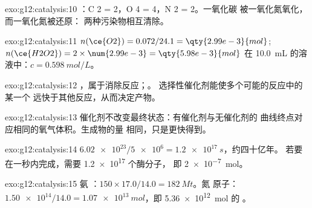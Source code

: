 \begin{solution}{exo:g12:catalysis:10}
：C 2 = 2，O 4 = 4，N 2 = 2。一氧化碳
被一氧化氮氧化，而一氧化氮被还原：
两种污染物相互清除。
\end{solution}

\begin{solution}{exo:g12:catalysis:11}
$n(\ce{O2}) = 0.072 / 24.1 = \qty{2.99e-3}{mol}$;
$n(\ce{H2O2}) = 2 \times \num{2.99e-3} = \qty{5.98e-3}{mol}$ 在
\qty{10.0}{mL} 的溶液中：$c = \qty{0.598}{mol/L}$。
\end{solution}

\begin{solution}{exo:g12:catalysis:12}
，属于消除反应；。
选择性催化剂能使多个可能的反应中的某一个
远快于其他反应，从而决定产物。
\end{solution}

\begin{solution}{exo:g12:catalysis:13}
催化剂不改变最终状态：有催化剂与无催化剂的
曲线终点对应相同的氧气体积。生成物的量
相同，只是更快得到。
\end{solution}

\begin{solution}{exo:g12:catalysis:14}
$\num{6.02e23} / \num{5e6} = \qty{1.2e17}{s}$，约四十亿年。
若要在一秒内完成，需要 \num{1.2e17} 个酶分子，
即 \qty{2e-7}{mol}。
\end{solution}

\begin{solution}{exo:g12:catalysis:15}
氨 ：$150 \times 17.0 / 14.0 = \qty{182}{Mt}$。氮
原子：$\num{1.50e14} / 14.0 = \qty{1.07e13}{mol}$，即
\qty{5.36e12}{mol} 的 。
\end{solution}

